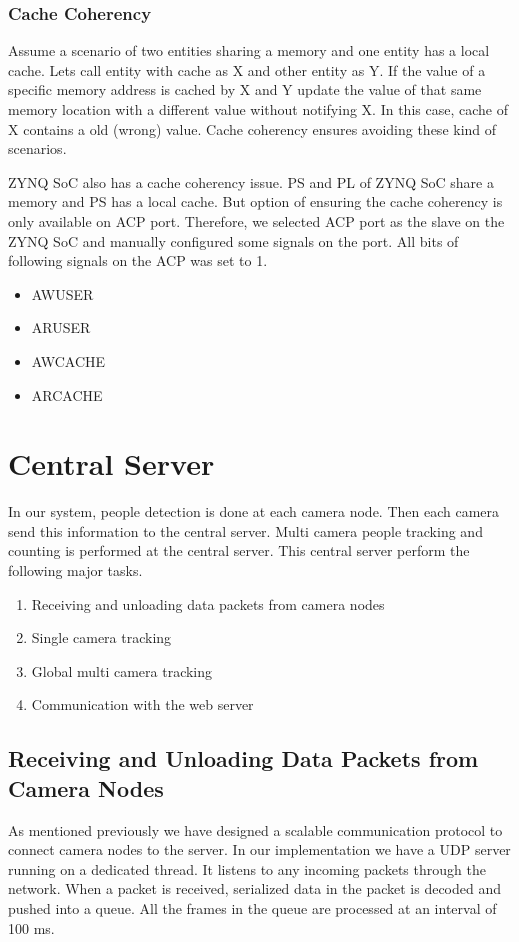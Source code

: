 \documentclass[12pt,a4paper]{report}
\begin{document}
\subsubsection{Cache Coherency}

Assume a scenario of two entities sharing a memory and one entity has a local cache. Lets call entity with cache as X and other entity as Y. If the value of a specific memory address is cached by X and Y update the value of that same memory location with a different value without notifying X. In this case, cache of X contains a old (wrong) value.  Cache coherency ensures avoiding these kind of scenarios. 
\par ZYNQ SoC also has a cache coherency issue. PS and PL of ZYNQ SoC share a memory and PS has a local cache. But option of ensuring the cache coherency is only available on ACP port. Therefore, we selected ACP port as the slave on the ZYNQ SoC and manually configured some signals on the port. All bits of following signals on the ACP was set to 1.
\begin{itemize}
\item AWUSER
\item ARUSER
\item AWCACHE
\item ARCACHE
\end{itemize}



\section{Central Server}
In our system, people detection is done at each camera node. Then each camera send this information to the central server. Multi camera people tracking and counting is performed at the central server. This central server perform the following major tasks.
\begin{enumerate}
\item Receiving and unloading data packets from camera nodes
\item Single camera tracking
\item Global multi camera tracking
\item Communication with the web server
\end{enumerate}

\subsection{Receiving and Unloading Data Packets from Camera Nodes}
As mentioned previously we have designed a scalable communication protocol to connect camera nodes to the server. In our implementation we have a UDP server running on a dedicated thread. It listens to any incoming packets through the network. When a packet is received, serialized data in the packet is decoded and pushed into a queue. All the frames in the queue are processed at an interval of 100 ms.
\end{document}

